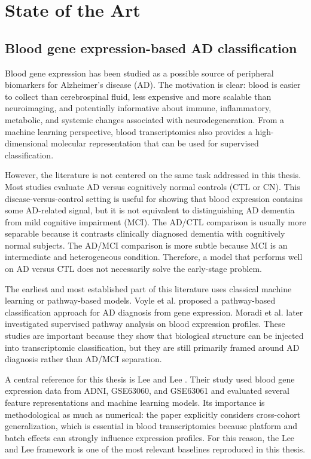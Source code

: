 \chapter{State of the Art}
\label{ch:state-of-art}

\section{Blood gene expression-based AD classification}
\label{sec:blood-expression-ad-classification}

Blood gene expression has been studied as a possible source of peripheral biomarkers for Alzheimer's disease (AD). The motivation is clear: blood is easier to collect than cerebrospinal fluid, less expensive and more scalable than neuroimaging, and potentially informative about immune, inflammatory, metabolic, and systemic changes associated with neurodegeneration. From a machine learning perspective, blood transcriptomics also provides a high-dimensional molecular representation that can be used for supervised classification.

However, the literature is not centered on the same task addressed in this thesis. Most studies evaluate AD versus cognitively normal controls (CTL or CN). This disease-versus-control setting is useful for showing that blood expression contains some AD-related signal, but it is not equivalent to distinguishing AD dementia from mild cognitive impairment (MCI). The AD/CTL comparison is usually more separable because it contrasts clinically diagnosed dementia with cognitively normal subjects. The AD/MCI comparison is more subtle because MCI is an intermediate and heterogeneous condition. Therefore, a model that performs well on AD versus CTL does not necessarily solve the early-stage problem.

The earliest and most established part of this literature uses classical machine learning or pathway-based models. Voyle et al. \cite{voyle2016pathway} proposed a pathway-based classification approach for AD diagnosis from gene expression. Moradi et al. \cite{moradi2019supervised} later investigated supervised pathway analysis on blood expression profiles. These studies are important because they show that biological structure can be injected into transcriptomic classification, but they are still primarily framed around AD diagnosis rather than AD/MCI separation.

A central reference for this thesis is Lee and Lee \cite{lee2020prediction}. Their study used blood gene expression data from ADNI, GSE63060, and GSE63061 and evaluated several feature representations and machine learning models. Its importance is methodological as much as numerical: the paper explicitly considers cross-cohort generalization, which is essential in blood transcriptomics because platform and batch effects can strongly influence expression profiles. For this reason, the Lee and Lee framework is one of the most relevant baselines reproduced in this thesis.

